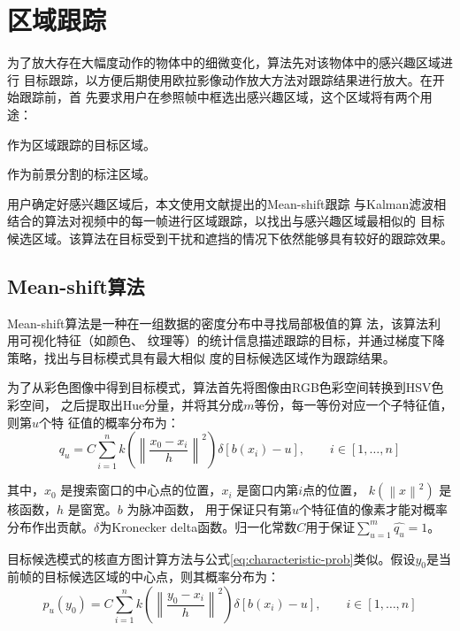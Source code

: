 \section{区域跟踪}
\label{sec:tracking}

为了放大存在大幅度动作的物体中的细微变化，算法先对该物体中的感兴趣区域进行
目标跟踪，以方便后期使用欧拉影像动作放大方法对跟踪结果进行放大。在开始跟踪前，首
先要求用户在参照帧中框选出感兴趣区域，这个区域将有两个用途：

\begin{compactenum}
\item 作为区域跟踪的目标区域。
\item 作为前景分割的标注区域。
\end{compactenum}

用户确定好感兴趣区域后，本文使用文献\cite{常发亮2007}提出的Mean-shift跟踪
与Kalman滤波相结合的算法对视频中的每一帧进行区域跟踪，以找出与感兴趣区域最相似的
目标候选区域。该算法在目标受到干扰和遮挡的情况下依然能够具有较好的跟踪效果。

\subsection{Mean-shift算法}
\label{sec:mean-shift}

Mean-shift算法是一种在一组数据的密度分布中寻找局部极值的算
法，该算法利用可视化特征（如颜色、
纹理等）的统计信息描述跟踪的目标，并通过梯度下降策略，找出与目标模式具有最大相似
度的目标候选区域作为跟踪结果。

为了从彩色图像中得到目标模式，算法首先将图像由RGB色彩空间转换到HSV色彩空间，
之后提取出Hue分量，并将其分成$m$等份，每一等份对应一个子特征值，则第$u$个特
征值的概率分布为：
\begin{equation}
  \label{eq:characteristic-prob}
  q_{u}=C\sum_{i=1}^{n}k\left( \left\| \frac{x_{0}-x_{i}}{h} \right\|^{2}
  \right)\delta[b(x_{i})-u],\qquad i\in[1,\ldots,n]
\end{equation}

其中，$x_{0}$ 是搜索窗口的中心点的位置，$x_{i}$ 是窗口内第$i$点的位置，
$k\left( \left\| x \right\|^{2} \right)$ 是核函数，$h$ 是窗宽。$b$ 为脉冲函数，
用于保证只有第$u$个特征值的像素才能对概率分布作出贡献。$\delta$为Kronecker
delta函数。归一化常数$C$用于保证$\sum_{u=1}^{m}\hat{q_u}=1$。

目标候选模式的核直方图计算方法与公式\ref{eq:characteristic-prob}类似。假设$y_0$是当前帧的目标候选区域的中心点，则其概率分布为：
\begin{equation}
  \label{eq:target-candidate}
  p_{u}(y_0)=C\sum_{i=1}^{n}k\left( \left\| \frac{y_{0}-x_{i}}{h} \right\|^{2}
  \right)\delta[b(x_{i})-u],\qquad i\in[1,\ldots,n]
\end{equation}

